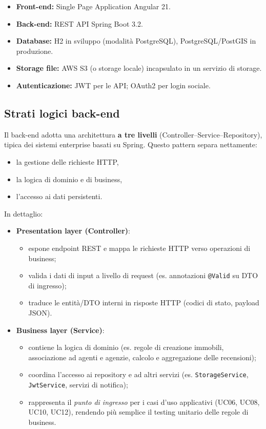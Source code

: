 \documentclass[a4paper,11pt]{report}
\begin{document}
\begin{itemize}[nosep]
  \item \textbf{Front-end:} Single Page Application Angular 21.
  \item \textbf{Back-end:} REST API Spring Boot 3.2.
  \item \textbf{Database:} H2 in sviluppo (modalità PostgreSQL), PostgreSQL/PostGIS in produzione.
  \item \textbf{Storage file:} AWS S3 (o storage locale) incapsulato in un servizio di storage.
  \item \textbf{Autenticazione:} JWT per le API; OAuth2 per login sociale.
\end{itemize}

\subsection{Strati logici back-end}

Il back-end adotta una architettura \textbf{a tre livelli} (Controller--Service--Repository), tipica dei sistemi enterprise basati su Spring. Questo pattern separa nettamente:

\begin{itemize}[nosep]
  \item la gestione delle richieste HTTP,
  \item la logica di dominio e di business,
  \item l'accesso ai dati persistenti.
\end{itemize}

In dettaglio:

\begin{itemize}[nosep]
    \item \textbf{Presentation layer (Controller)}:
    \begin{itemize}[nosep]
      \item espone endpoint REST e mappa le richieste HTTP verso operazioni di business;
      \item valida i dati di input a livello di request (es. annotazioni \texttt{@Valid} su DTO di ingresso);
      \item traduce le entità/DTO interni in risposte HTTP (codici di stato, payload JSON).
    \end{itemize}
    
    \item \textbf{Business layer (Service)}:
    \begin{itemize}[nosep]
      \item contiene la logica di dominio (es. regole di creazione immobili, associazione ad agenti e agenzie, calcolo e aggregazione delle recensioni);
      \item coordina l'accesso ai repository e ad altri servizi (es. \texttt{StorageService}, \texttt{JwtService}, servizi di notifica);
      \item rappresenta il \emph{punto di ingresso} per i casi d'uso applicativi (UC06, UC08, UC10, UC12), rendendo più semplice il testing unitario delle regole di business.
    \end{itemize}
\end{itemize}
\end{document}
